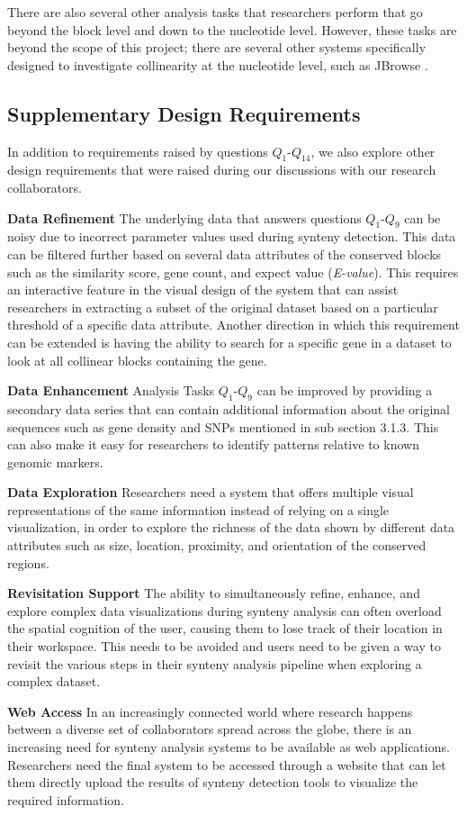 There are also several other analysis tasks that researchers perform that go beyond the block level and down to the nucleotide level. However, these tasks are beyond the scope of this project; there are several other systems specifically designed to investigate collinearity at the nucleotide level, such as JBrowse \cite{skinner2009jbrowse}.


\subsection{Supplementary Design Requirements}
In addition to requirements raised by questions $Q_1$-$Q_{14}$, we also explore other design requirements that were raised during our discussions with our research collaborators. 

\textbf{Data Refinement} The underlying data that answers questions $Q_1$-$Q_9$ can be noisy due to incorrect parameter values used during synteny detection. This data can be filtered further based on several data attributes of the conserved blocks such as the similarity score, gene count, and expect value (\textit{E-value}). This requires an interactive feature in the visual design of the system that can assist researchers in extracting a subset of the original dataset based on a particular threshold of a specific data attribute. Another direction in which this requirement can be extended is having the ability to search for a specific gene in a dataset to look at all collinear blocks containing the gene.

\textbf{Data Enhancement} Analysis Tasks $Q_1$-$Q_9$ can be improved by providing a secondary data series that can contain additional information about the original sequences such as gene density and SNPs mentioned in sub section 3.1.3. This can also make it easy for researchers to identify patterns relative to known genomic markers.

\textbf{Data Exploration} Researchers need a system that offers multiple visual representations of the same information instead of relying on a single visualization, in order to explore the richness of the data shown by different data attributes such as size, location, proximity, and orientation of the conserved regions.

\textbf{Revisitation Support} The ability to simultaneously refine, enhance, and explore complex data visualizations during synteny analysis can often overload the spatial cognition of the user, causing them to lose track of their location in their workspace. This needs to be avoided and users need to be given a way to revisit the various steps in their synteny analysis pipeline when exploring a complex dataset.

\textbf{Web Access} In an increasingly connected world where research happens between a diverse set of collaborators spread across the globe, there is an increasing need for synteny analysis systems to be available as web applications. Researchers need the final system to be accessed through a website that can let them directly upload the results of synteny detection tools to visualize the required information.




